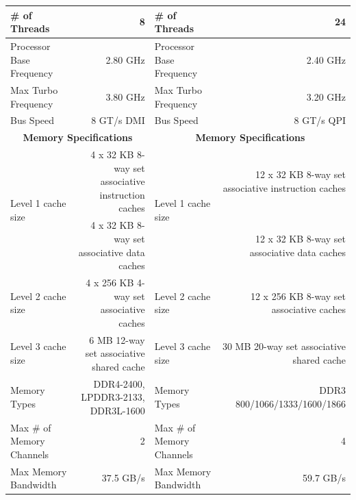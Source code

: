 \documentclass[twoside,twocolumn]{article}
\begin{document}
\begin{appendices}
\begin{table}[ht]
{\begin{tabular}{|l|r|l|r|}
\# of Threads                       & 8                                                  & \# of Threads                       & 24                                                  \\ \hline
Processor Base Frequency            & 2.80 GHz                                           & Processor Base Frequency            & 2.40 GHz                                            \\ \hline
Max Turbo Frequency                 & 3.80 GHz                                           & Max Turbo Frequency                 & 3.20 GHz                                            \\ \hline
Bus Speed                           & 8 GT/s DMI                                         & Bus Speed                           & 8 GT/s QPI                                          \\ \hline
\multicolumn{2}{|c|}{\textbf{Memory Specifications}}                                     & \multicolumn{2}{c|}{\textbf{Memory Specifications}}                                       \\ \hline
\multirow{2}{*}{Level 1 cache size} & 4 x 32 KB 8-way set associative instruction caches & \multirow{2}{*}{Level 1 cache size} & 12 x 32 KB 8-way set associative instruction caches \\ \cline{2-2} \cline{4-4} 
                                    & 4 x 32 KB 8-way set associative data caches        &                                     & 12 x 32 KB 8-way set associative data caches        \\ \hline
Level 2 cache size                  & 4 x 256 KB 4-way set associative caches            & Level 2 cache size                  & 12 x 256 KB 8-way set associative caches            \\ \hline
Level 3 cache size                  & 6 MB 12-way set associative shared cache           & Level 3 cache size                  & 30 MB 20-way set associative shared cache           \\ \hline
Memory Types                        & DDR4-2400, LPDDR3-2133, DDR3L-1600                 & Memory Types                        & DDR3 800/1066/1333/1600/1866                        \\ \hline
Max \# of Memory Channels           & 2                                                  & Max \# of Memory Channels           & 4                                                   \\ \hline
Max Memory Bandwidth                & 37.5 GB/s                                          & Max Memory Bandwidth                & 59.7 GB/s                                           \\ \hline

\end{tabular}}
\end{table}
\end{appendices}
\end{document}
